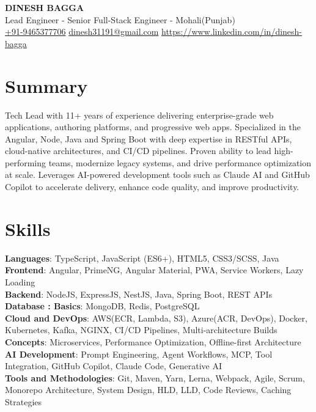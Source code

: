 \documentclass[letterpaper,11pt]{article}
\begin{document}
\begin{center}
\textbf{\Large DINESH BAGGA} \\
Lead Engineer - Senior Full-Stack Engineer - Mohali(Punjab) \\
{\footnotesize \href{tel:+91-9465377706}{+91-9465377706} \quad \href{mailto:dinesh31191@gmail.com}{dinesh31191@gmail.com} \quad \href{https://www.linkedin.com/in/dinesh-bagga}{https://www.linkedin.com/in/dinesh-bagga}}
\end{center}

\section{\textbf{Summary}}
Tech Lead with 11+ years of experience delivering enterprise-grade web applications, authoring platforms, and progressive web apps. Specialized in the Angular, Node, Java and Spring Boot with deep expertise in RESTful APIs, cloud-native architectures, and CI/CD pipelines. Proven ability to lead high-performing teams, modernize legacy systems, and drive performance optimization at scale. Leverages AI-powered development tools such as Claude AI and GitHub Copilot to accelerate delivery, enhance code quality, and improve productivity.
\section{\textbf{Skills}}
\textbf{Languages}: TypeScript, JavaScript (ES6+), HTML5, CSS3/SCSS, Java \\
\textbf{Frontend}: Angular, PrimeNG, Angular Material, PWA, Service Workers, Lazy Loading \\
\textbf{Backend}: NodeJS, ExpressJS, NestJS, Java, Spring Boot, REST APIs \\
\textbf{Database : Basics}: MongoDB, Redis, PostgreSQL \\
\textbf{Cloud and DevOps}: AWS(ECR, Lambda, S3), Azure(ACR, DevOps), Docker, Kubernetes, Kafka, NGINX, CI/CD Pipelines, Multi-architecture Builds \\
\textbf{Concepts}: Microservices, Performance Optimization, Offline-first Architecture \\
\textbf{AI Development}: Prompt Engineering, Agent Workflows, MCP, Tool Integration, GitHub Copilot, Claude Code, Generative AI \\
\textbf{Tools and Methodologies}: Git, Maven, Yarn, Lerna, Webpack, Agile, Scrum, Monorepo Architecture, System Design, HLD, LLD, Code Reviews, Caching Strategies \\
\end{document}
